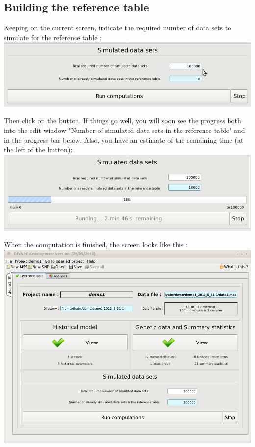 \subsection{Building the reference table}

Keeping on the current screen, indicate the required number of data sets to simulate for the reference table : \\ 

\includegraphics[scale=0.35]{gui_pictures/Capture-DIYABC-24.png} 


Then click on the  button. If things go well, you will soon see the progress both into the edit window "Number of simulated data sets in the reference table" and in the progress bar below. Also, you have an estimate of the remaining time (at the left of the   button):\\

\includegraphics[scale=0.35]{gui_pictures/Capture-DIYABC-25.png} 

When the computation is finished, the screen looks like this :\\

\includegraphics[scale=0.35]{gui_pictures/Capture-DIYABC-26.png} 

